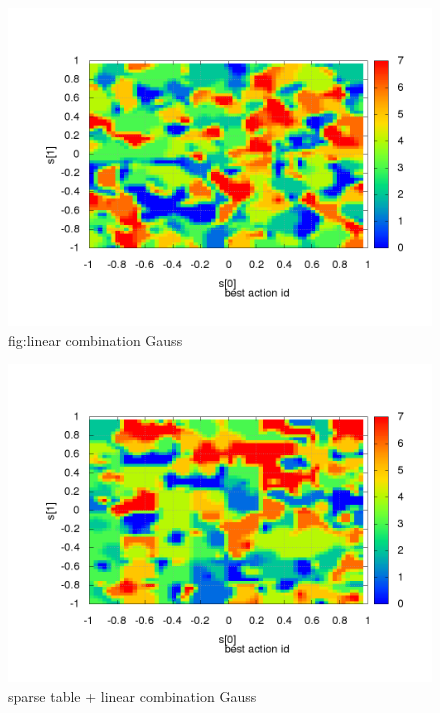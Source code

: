 \begin{figure}[!htb]
\centering
\includegraphics[scale=.7]{../../results_q_learning/map_1/function_type_2/iterations_10/action_best_value_log_surface.png}
\caption{fig:linear combination Gauss}
\end{figure}




\begin{figure}
\includegraphics[scale=.21]{../../results_q_learning/map_1/function_type_3/iterations_10/action_best_value_log_surface.png}
\caption{sparse table + linear combination Gauss}
\end{figure}


